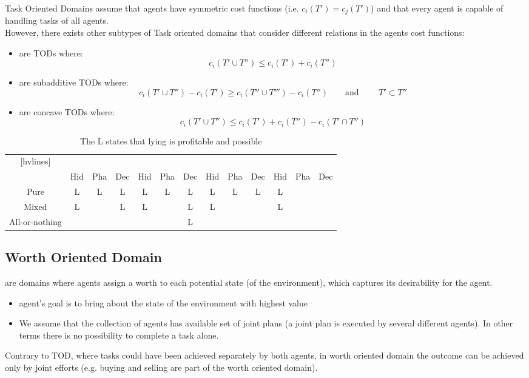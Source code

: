 Task Oriented Domains assume that agents have symmetric cost functions (i.e. $c_i(T') = c_j(T')$) and that every agent is capable of handling tasks of all agents.\\
However, there exists other subtypes of Task oriented domains that consider different relations in the agents cost functions:
\begin{itemize}
\item {} are TODs where:
\[c_i (T' \cup T'') \le c_i(T') + c_i(T'')\]
\item {} are subadditive TODs where:
\[c_i (T' \cup T'') - c_i(T') \ge c_i (T'' \cup T''') -  c_i(T'')\qquad \text{and }\qquad T' \subset T''\]
\item {} are concave TODs where:
\[c_i (T' \cup T'') \le c_i(T') + c_i(T'') - c_i (T'\cap T'')\]
\end{itemize} 

\begin{table}[!h]
\centering
\begin{NiceTabular}{ccccccccccccc}[hvlines]
&&&&&&&&&&&&\\
& Hid & Pha & Dec& Hid & Pha & Dec& Hid & Pha & Dec& Hid & Pha & Dec\\
Pure&L& L& L& L& L& L& L& L& L& L& & \\
Mixed&L& & L& L&  & L& L& & & L& & \\
All-or-nothing&& & & &  & L& & & & &  & \\
\end{NiceTabular}
\caption{The L states that lying is profitable and possible}
\end{table}


\subsection{Worth Oriented Domain}
 \phantom{c} are domains where agents assign a worth to each potential state (of the environment), which captures its desirability for the agent.
\begin{itemize}
\item agent's goal is to bring about the state of the environment with highest value
\item We assume that the collection of agents has available set of joint plans (a joint plan is executed by several different agents). In other terms there is no possibility to complete a task alone.
\end{itemize}
Contrary to TOD, where tasks could have been achieved separately by both agents, in worth oriented domain the outcome can be achieved only by joint efforts (e.g. buying and selling are part of the worth oriented domain).
 
